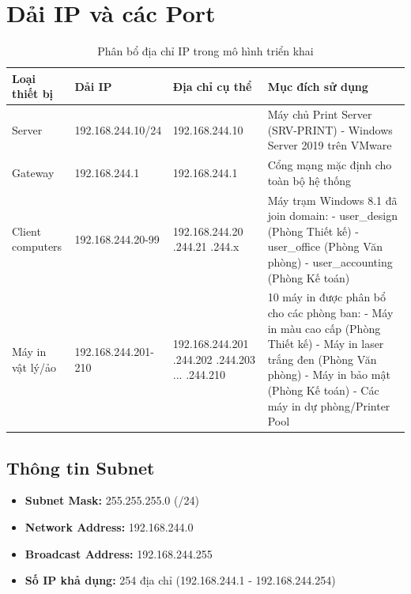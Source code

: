 \section{Dải IP và các Port}
\begin{table}[htbp]
\centering
\small
\caption{Phân bổ địa chỉ IP trong mô hình triển khai}
\label{tab:ip-allocation}
\begin{tabular}{|p{2.8cm}|p{2.8cm}|p{3.2cm}|p{4.8cm}|}
\hline
\textbf{Loại thiết bị} & \textbf{Dải IP} & \textbf{Địa chỉ cụ thể} & \textbf{Mục đích sử dụng} \\ \hline
Server & 192.168.244.10/24 & 192.168.244.10 & Máy chủ Print Server (SRV-PRINT) - Windows Server 2019 trên VMware \\ \hline
Gateway & 192.168.244.1 & 192.168.244.1 & Cổng mạng mặc định cho toàn bộ hệ thống \\ \hline
Client computers & 192.168.244.20-99 & 192.168.244.20 \newline 192.168.244.21 \newline 192.168.244.x & Máy trạm Windows 8.1 đã join domain: \newline - user\_design (Phòng Thiết kế) \newline - user\_office (Phòng Văn phòng) \newline - user\_accounting (Phòng Kế toán) \\ \hline
Máy in vật lý/ảo & 192.168.244.201-210 & 192.168.244.201 \newline 192.168.244.202 \newline 192.168.244.203 \newline ... \newline 192.168.244.210 & 10 máy in được phân bổ cho các phòng ban: \newline - Máy in màu cao cấp (Phòng Thiết kế) \newline - Máy in laser trắng đen (Phòng Văn phòng) \newline - Máy in bảo mật (Phòng Kế toán) \newline - Các máy in dự phòng/Printer Pool \\ \hline
\end{tabular}
\end{table}

\subsection*{Thông tin Subnet}
\begin{itemize}[leftmargin=*,noitemsep,topsep=3pt]
    \item \textbf{Subnet Mask:} 255.255.255.0 (/24)
    \item \textbf{Network Address:} 192.168.244.0
    \item \textbf{Broadcast Address:} 192.168.244.255
    \item \textbf{Số IP khả dụng:} 254 địa chỉ (192.168.244.1 - 192.168.244.254)
\end{itemize}

